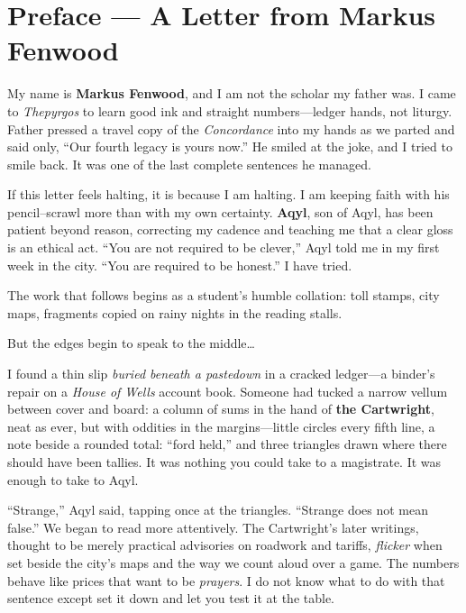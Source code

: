 \documentclass[11pt]{article}
\begin{document}
\clearpage
\section*{Preface — A Letter from Markus Fenwood}
\label{sec:preface-markus}
{}

My name is \textbf{Markus Fenwood}, and I am not the scholar my father was. I came to \textit{Thepyrgos} to learn good ink and straight numbers—ledger hands, not liturgy. Father pressed a travel copy of the \emph{Concordance} into my hands as we parted and said only, ``Our fourth legacy is yours now.'' He smiled at the joke, and I tried to smile back. It was one of the last complete sentences he managed.

If this letter feels halting, it is because I am halting. I am keeping faith with his pencil--scrawl more than with my own certainty. \textbf{Aqyl}, son of Aqyl, has been patient beyond reason, correcting my cadence and teaching me that a clear gloss is an ethical act. ``You are not required to be clever,'' Aqyl told me in my first week in the city. ``You are required to be honest.'' I have tried.

The work that follows begins as a student's humble collation: toll stamps, city maps, fragments copied on rainy nights in the reading stalls.

But the edges begin to speak to the middle\ldots{}

I found a thin slip \textit{buried beneath a pastedown} in a cracked ledger—a binder's repair on a \textit{House of Wells} account book. Someone had tucked a narrow vellum between cover and board: a column of sums in the hand of \textbf{the Cartwright}, neat as ever, but with oddities in the margins—little circles every fifth line, a note beside a rounded total: ``ford held,'' and three triangles drawn where there should have been tallies. It was nothing you could take to a magistrate. It was enough to take to Aqyl.

``Strange,'' Aqyl said, tapping once at the triangles. ``Strange does not mean false.'' We began to read more attentively. The Cartwright's later writings, thought to be merely practical advisories on roadwork and tariffs, \textit{flicker} when set beside the city's maps and the way we count aloud over a game. The numbers behave like prices that want to be \textit{prayers}. I do not know what to do with that sentence except set it down and let you test it at the table.
\end{document}
